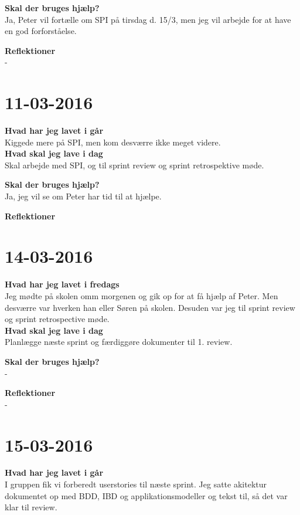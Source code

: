 \documentclass{article}
\begin{document}
	\textbf{Skal der bruges hjælp?}\\
	Ja, Peter vil fortælle om SPI på tirsdag d. 15/3, men jeg vil arbejde for at have en god forforståelse.
	
	\textbf{Reflektioner}\\
	-
	
	\section{11-03-2016}
	
	\textbf{Hvad har jeg lavet i går}\\
	Kiggede mere på SPI, men kom desværre ikke meget videre.\\
	
	\textbf{Hvad skal jeg lave i dag}\\
	Skal arbejde med SPI, og til sprint review og sprint retrospektive møde.     
	
	\textbf{Skal der bruges hjælp?}\\
	Ja, jeg vil se om Peter har tid til at hjælpe.
	
	\textbf{Reflektioner}\\
	
	
	\section{14-03-2016}
	
	\textbf{Hvad har jeg lavet i fredags}\\
	Jeg mødte på skolen omm morgenen og gik op for at få hjælp af Peter. Men desværre var hverken han eller Søren på skolen.
	Desuden var jeg til sprint review og sprint retrospective møde.\\
	
	\textbf{Hvad skal jeg lave i dag}\\
	Planlægge næste sprint og færdiggøre dokumenter til 1. review.     
	
	\textbf{Skal der bruges hjælp?}\\
	-
	
	\textbf{Reflektioner}\\
	-
	
	\section{15-03-2016}
	
	\textbf{Hvad har jeg lavet i går}\\
	I gruppen fik vi forberedt userstories til næste sprint. Jeg satte akitektur dokumentet op med BDD, IBD og applikationsmodeller og tekst til, så det var klar til review. \\
	
\end{document}

